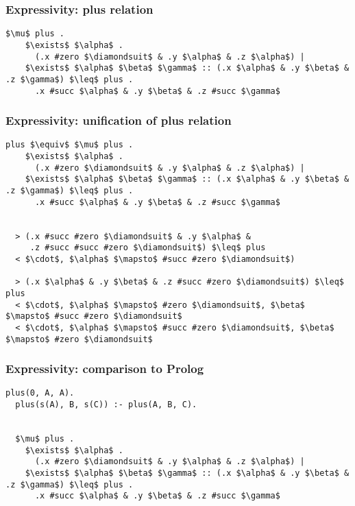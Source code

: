 \documentclass{beamer}
\begin{document}
\begin{frame}[fragile]
  \frametitle{Expressivity: plus relation}

  \begin{lstlisting}[]
  $\mu$ plus .
    $\exists$ $\alpha$ . 
      (.x #zero $\diamondsuit$ & .y $\alpha$ & .z $\alpha$) |
    $\exists$ $\alpha$ $\beta$ $\gamma$ :: (.x $\alpha$ & .y $\beta$ & .z $\gamma$) $\leq$ plus . 
      .x #succ $\alpha$ & .y $\beta$ & .z #succ $\gamma$
  \end{lstlisting}
\end{frame}

\begin{frame}[fragile]
  \frametitle{Expressivity: unification of plus relation}

  \begin{lstlisting}[]
  plus $\equiv$ $\mu$ plus .
    $\exists$ $\alpha$ . 
      (.x #zero $\diamondsuit$ & .y $\alpha$ & .z $\alpha$) |
    $\exists$ $\alpha$ $\beta$ $\gamma$ :: (.x $\alpha$ & .y $\beta$ & .z $\gamma$) $\leq$ plus . 
      .x #succ $\alpha$ & .y $\beta$ & .z #succ $\gamma$


  > (.x #succ #zero $\diamondsuit$ & .y $\alpha$ &
     .z #succ #succ #zero $\diamondsuit$) $\leq$ plus
  < $\cdot$, $\alpha$ $\mapsto$ #succ #zero $\diamondsuit$)

  > (.x $\alpha$ & .y $\beta$ & .z #succ #zero $\diamondsuit$) $\leq$ plus
  < $\cdot$, $\alpha$ $\mapsto$ #zero $\diamondsuit$, $\beta$ $\mapsto$ #succ #zero $\diamondsuit$
  < $\cdot$, $\alpha$ $\mapsto$ #succ #zero $\diamondsuit$, $\beta$ $\mapsto$ #zero $\diamondsuit$
  \end{lstlisting}


\end{frame}
\begin{frame}[fragile]
  \frametitle{Expressivity: comparison to Prolog}

  \begin{lstlisting}[]
  plus(0, A, A).
  plus(s(A), B, s(C)) :- plus(A, B, C).


  $\mu$ plus .
    $\exists$ $\alpha$ . 
      (.x #zero $\diamondsuit$ & .y $\alpha$ & .z $\alpha$) |
    $\exists$ $\alpha$ $\beta$ $\gamma$ :: (.x $\alpha$ & .y $\beta$ & .z $\gamma$) $\leq$ plus . 
      .x #succ $\alpha$ & .y $\beta$ & .z #succ $\gamma$
  \end{lstlisting}

\end{frame}
\end{document}
